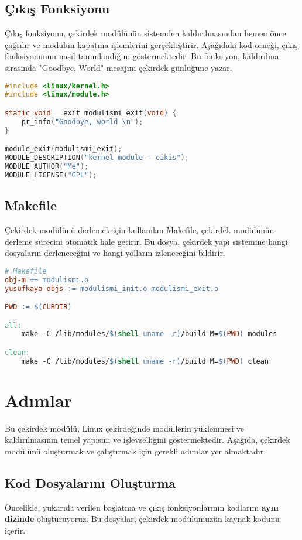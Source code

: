 \documentclass[a4paper,12pt]{article}
\begin{document}
\subsection{Çıkış Fonksiyonu}
Çıkış fonksiyonu, çekirdek modülünün sistemden kaldırılmasından hemen önce çağrılır ve modülün kapatma işlemlerini gerçekleştirir. Aşağıdaki kod örneği, çıkış fonksiyonunun nasıl tanımlandığını göstermektedir. Bu fonksiyon, kaldırılma sırasında "Goodbye, World" mesajını çekirdek günlüğüne yazar.

\begin{lstlisting}[language=C, caption={Çıkış fonksiyonu}]
#include <linux/kernel.h>
#include <linux/module.h>

static void __exit modulismi_exit(void) {
    pr_info("Goodbye, world \n");
}

module_exit(modulismi_exit);
MODULE_DESCRIPTION("kernel module - cikis");
MODULE_AUTHOR("Me");
MODULE_LICENSE("GPL");
\end{lstlisting}

\subsection{Makefile}
Çekirdek modülünü derlemek için kullanılan Makefile, çekirdek modülünün derleme sürecini otomatik hale getirir. Bu dosya, çekirdek yapı sistemine hangi dosyaların derleneceğini ve hangi yolların izleneceğini bildirir.

\begin{lstlisting}[language=make, caption={Makefile}]
# Makefile
obj-m += modulismi.o
yusufkaya-objs := modulismi_init.o modulismi_exit.o

PWD := $(CURDIR)

all:
	make -C /lib/modules/$(shell uname -r)/build M=$(PWD) modules

clean:
	make -C /lib/modules/$(shell uname -r)/build M=$(PWD) clean

\end{lstlisting}

\section{Adımlar}
Bu çekirdek modülü, Linux çekirdeğinde modüllerin yüklenmesi ve kaldırılmasının temel yapısını ve işlevselliğini göstermektedir. Aşağıda, çekirdek modülünü oluşturmak ve çalıştırmak için gerekli adımlar yer almaktadır.

\subsection{Kod Dosyalarını Oluşturma}
Öncelikle, yukarıda verilen başlatma ve çıkış fonksiyonlarının kodlarını \textbf{aynı dizinde} oluşturuyoruz. Bu dosyalar, çekirdek modülümüzün kaynak kodunu içerir.
\end{document}
